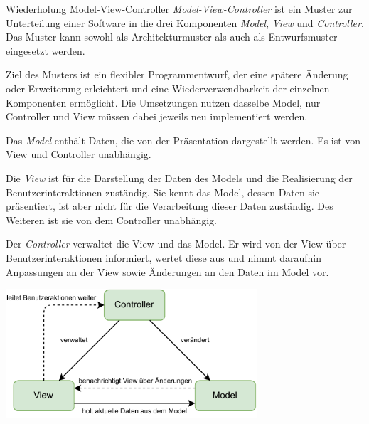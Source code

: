 \begin{bonus}{Wiederholung Model-View-Controller}
    \emph{Model-View-Controller}  ist ein Muster zur Unterteilung einer Software in die drei Komponenten \emph{Model}, \emph{View} und \emph{Controller}.
    Das Muster kann sowohl als Architekturmuster als auch als Entwurfsmuster eingesetzt werden.

    Ziel des Musters ist ein flexibler Programmentwurf, der eine spätere Änderung oder Erweiterung erleichtert und eine Wiederverwendbarkeit der einzelnen Komponenten ermöglicht.
    Die Umsetzungen nutzen dasselbe Model, nur Controller und View müssen dabei jeweils neu implementiert werden.

    Das \emph{Model} enthält Daten, die von der Präsentation dargestellt werden.
    Es ist von View und Controller unabhängig.

    Die \emph{View} ist für die Darstellung der Daten des Models und die Realisierung der Benutzerinteraktionen zuständig.
    Sie kennt das Model, dessen Daten sie präsentiert, ist aber nicht für die Verarbeitung dieser Daten zuständig.
    Des Weiteren ist sie von dem Controller unabhängig.

    Der \emph{Controller} verwaltet die View und das Model.
    Er wird von der View über Benutzerinteraktionen informiert, wertet diese aus und nimmt daraufhin Anpassungen an der View sowie Änderungen an den Daten im Model vor.

    \begin{center}
        \includegraphics[width=0.7\textwidth]{includes/figures/defi_mvc.pdf}
    \end{center}
\end{bonus}

